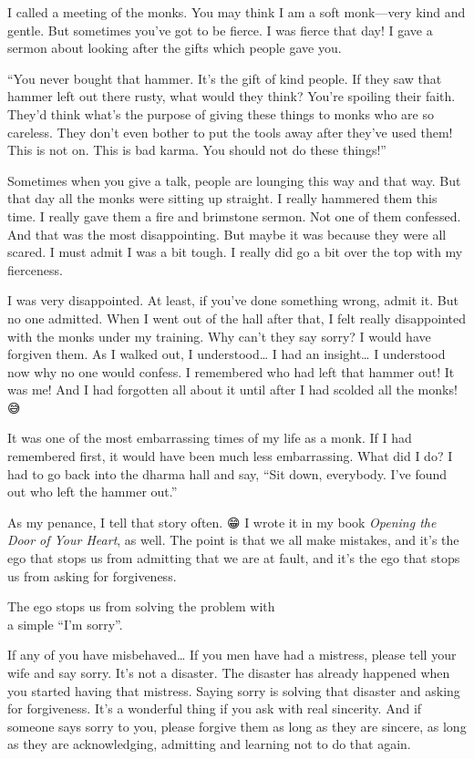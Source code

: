 \documentclass[12pt, openany]{book}
\newenvironment{aphorism}%
{%
\begin{center}\begin{itshape}
}%
{\end{itshape}\end{center}
}%
\begin{document}
I called a meeting of the monks. You may think I am a soft monk—very kind and gentle. But sometimes you’ve got to be fierce. I was fierce that day! I gave a sermon about looking after the gifts which people gave you. 

“You never bought that hammer. It’s the gift of kind people. If they saw that hammer left out there rusty, what would they think? You’re spoiling their faith. They’d think what’s the purpose of giving these things to monks who are so careless. They don’t even bother to put the tools away after they’ve used them! This is not on. This is bad karma. You should not do these things!” 

Sometimes when you give a talk, people are lounging this way and that way. But that day all the monks were sitting up straight. I really hammered them this time. I really gave them a fire and brimstone sermon. Not one of them confessed. And that was the most disappointing. But maybe it was because they were all scared. I must admit I was a bit tough. I really did go a bit over the top with my fierceness. 

I was very disappointed. At least, if you’ve done something wrong, admit it. But no one admitted. When I went out of the hall after that, I felt really disappointed with the monks under my training. Why can’t they say sorry? I would have forgiven them. As I walked out, I understood… I had an insight… I understood now why no one would confess. I remembered who had left that hammer out! It was me! And I had forgotten all about it until after I had scolded all the monks! 😅

It was one of the most embarrassing times of my life as a monk. If I had remembered first, it would have been much less embarrassing. What did I do? I had to go back into the dharma hall and say, “Sit down, everybody. I’ve found out who left the hammer out.” 

As my penance, I tell that story often. 😁 I wrote it in my book \emph{Opening the Door of Your Heart}, as well. The point is that we all make mistakes, and it’s the ego that stops us from admitting that we are at fault, and it’s the ego that stops us from asking for forgiveness. 

\begin{aphorism}
The ego stops us from solving the problem with\\  
a simple “I’m sorry”.
\end{aphorism}

If any of you have misbehaved… If you men have had a mistress, please tell your wife and say sorry. It’s not a disaster. The disaster has already happened when you started having that mistress. Saying sorry is solving that disaster and asking for forgiveness. It’s a wonderful thing if you ask with real sincerity. And if someone says sorry to you, please forgive them as long as they are sincere, as long as they are acknowledging, admitting and learning not to do that again. 
\end{document}

